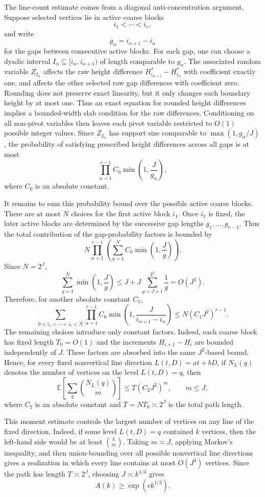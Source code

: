 \documentclass[11pt]{article}
\theoremstyle{definition}
\theoremstyle{remark}
\newcommand{\E}{\mathbb E}
\newcommand{\1}{\mathbf 1}
\begin{document}
\bigskip
\noindent
The line-count estimate comes from a diagonal anti-concentration argument. Suppose selected vertices lie in active coarse blocks
\[
i_1<\cdots<i_r,
\]
and write
\[
g_\alpha=i_{\alpha+1}-i_\alpha
\]
for the gaps between consecutive active blocks. For each gap, one can choose a dyadic interval $I_\alpha\subseteq[i_\alpha,i_{\alpha+1})$ of length comparable to $g_\alpha$. The associated random variable $Z_{I_\alpha}$ affects the raw height difference $H_{i_{\alpha+1}}^*-H_{i_\alpha}^*$ with coefficient exactly one, and affects the other selected raw gap differences with coefficient zero. Rounding does not preserve exact linearity, but it only changes each boundary height by at most one. Thus an exact equation for rounded height differences implies a bounded-width slab condition for the raw differences. Conditioning on all non-pivot variables then leaves each pivot variable restricted to $O(1)$ possible integer values. Since $Z_{I_\alpha}$ has support size comparable to $\max(1,g_\alpha/J)$, the probability of satisfying prescribed height differences across all gaps is at most
\[
\prod_{\alpha=1}^{r-1}
C_0\min\left(1,\frac{J}{g_\alpha}\right),
\]
where $C_0$ is an absolute constant.

\bigskip
\noindent
It remains to sum this probability bound over the possible active coarse blocks. There are at most $N$ choices for the first active block $i_1$. Once $i_1$ is fixed, the later active blocks are determined by the successive gap lengths $g_1,\ldots,g_{r-1}$. Thus the total contribution of the gap-probability factors is bounded by
\[
N\prod_{\alpha=1}^{r-1}
\left(
\sum_{g=1}^{N} C_0\min\left(1,\frac{J}{g}\right)
\right).
\]
Since $N=2^J$,
\[
\sum_{g=1}^{N}\min\left(1,\frac{J}{g}\right)
\le
J+J\sum_{g=J+1}^{2^J}\frac1g
=O(J^2).
\]
Therefore, for another absolute constant $C_1$,
\[
\sum_{0\le i_1<\cdots<i_r<N}
\prod_{\alpha=1}^{r-1}
C_0\min\left(1,\frac{J}{i_{\alpha+1}-i_\alpha}\right)
\le
N(C_1J^2)^{r-1}.
\]
The remaining choices introduce only constant factors. Indeed, each coarse block has fixed length $T_0=O(1)$ and the increments $H_{i+1}-H_i$ are bounded independently of $J$. These factors are absorbed into the same $J^2$-based bound. Hence, for every fixed nonvertical line direction $L(t,D)=at+bD$, if $N_L(q)$ denotes the number of vertices on the level $L(t,D)=q$, then
\[
\E\left[\sum_q\binom{N_L(q)}{m}\right]
\le
T(C_2J^2)^m,\qquad m\le J,
\]
where $C_2$ is an absolute constant and $T=NT_0\asymp 2^J$ is the total path length.

\bigskip
\noindent
This moment estimate controls the largest number of vertices on any line of the fixed direction. Indeed, if some level $L(t,D)=q$ contained $k$ vertices, then the left-hand side would be at least $\binom{k}{m}$. Taking $m\asymp J$, applying Markov's inequality, and then union-bounding over all possible nonvertical line directions gives a realization in which every line contains at most $O(J^3)$ vertices. Since the path has length $T\asymp 2^J$, choosing $J\asymp k^{1/3}$ gives
\[
A(k)\ge \exp(c k^{1/3}).
\]
\end{document}
